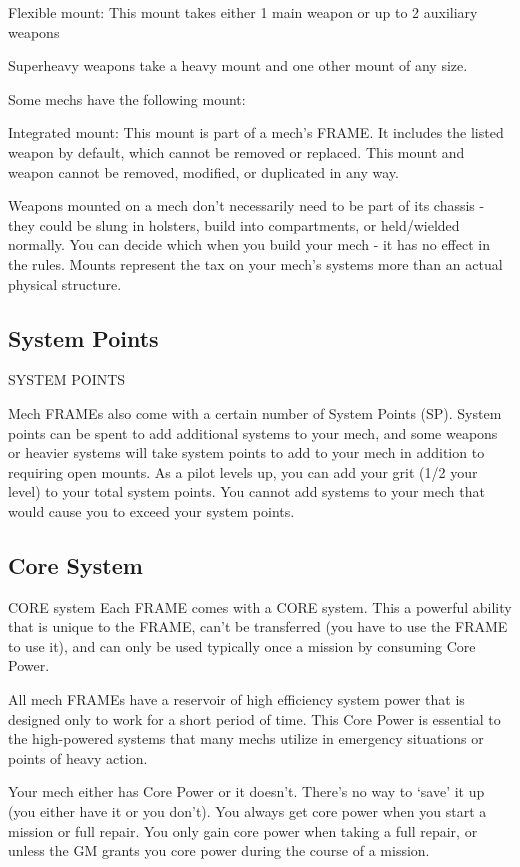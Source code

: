 Flexible mount: This mount takes either 1 main weapon or up to 2 auxiliary weapons
 

Superheavy weapons take a heavy mount and one other mount of any size.
 

Some mechs have the following mount:
 

Integrated mount: This mount is part of a mech’s FRAME. It includes the listed weapon by  
default, which cannot be removed or replaced. This mount and weapon cannot be removed,  
modified, or duplicated in any way. 
 

Weapons mounted on a mech don’t necessarily need to be part of its chassis - they could be  
slung in holsters, build into compartments, or held/wielded normally. You can decide which when  
you build your mech - it has no effect in the rules. Mounts represent the tax on your mech’s  
systems more than an actual physical structure.
 

\subsection{System Points}
                                          SYSTEM POINTS
 

Mech FRAMEs also come with a certain number of System Points (SP). System points can be  
spent to add additional systems to your mech, and some weapons or heavier systems will take  
system points to add to your mech in addition to requiring open mounts. As a pilot levels up, you  
can add your grit (1/2 your level) to your total system points. You cannot add systems to your  
mech that would cause you to exceed your system points.
 
\subsection{Core System}
                                             CORE system   
Each FRAME comes with a CORE system. This a powerful ability that is unique to the FRAME,  
can’t be transferred (you have to use the FRAME to use it), and can only be used typically once a  
mission by consuming Core Power.
 

All mech FRAMEs have a reservoir of high efficiency system power that is designed only to work  
for a short period of time. This Core Power is essential to the high-powered systems that many  
mechs utilize in emergency situations or points of heavy action.
 

Your mech either has Core Power or it doesn’t. There’s no way to ‘save’ it up (you either have it  
or you don’t). You always get core power when you start a mission or full repair. You only gain  
core power when taking a full repair, or unless the GM grants you core power during the course  
of a mission.
 
